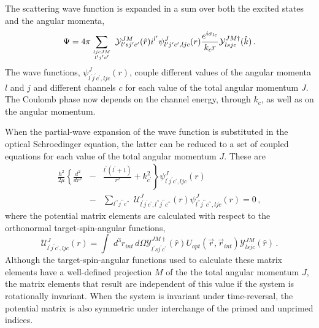 \documentclass[twocolumn,amsmath,amssymb,10pt,groupedaddress,a4paper]{revtex4}
\begin{document}
The scattering wave function is expanded in a sum over both the excited
states and the angular momenta, \begin{equation}
\Psi=4\pi\sum_{{{ljcJM\atop l^{\prime}j^{\prime}c^{\prime}}}}\;{\mathcal{Y}}_{l^{\prime}sj^{\prime}c^{\prime}}^{JM}(\hat{r})i^{l^{\prime}}\psi_{l^{\prime}j^{\prime}c^{\prime},ljc}^{J}(r)\frac{e^{i\sigma_{lc}}}{k_{c}r}{\mathcal{Y}}_{lsjc}^{JM\dagger}(\hat{k})\,.\label{cpar}\end{equation}
The wave functions, $\psi_{l^{\prime}j^{\prime}c^{\prime},ljc}^{J}(r)$,
couple different values of the angular momenta $l$ and $j$ and different
channels $c$ for each value of the total angular momentum $J$.  The
Coulomb phase now depends on the channel energy, through $k_{c}$,
as well as on the angular momentum.

When the partial-wave expansion of the wave function is substituted
in the optical Schroedinger equation, the latter can be reduced
to a set of coupled equations for each value of the total angular
momentum $J$. These are \begin{eqnarray}
\frac{\hbar^{2}}{2\mu}\left\{ \frac{d^{2}}{dr^{2}}\right. & - & \left.\frac{l^{\prime}(l^{\prime}+1)}{r^{2}}+k_{c^{\prime}}^{2}\right\} \psi_{l^{\prime}j^{\prime}c^{\prime},ljc}^{J}(r)\\
 & - & \sum_{l^{\prime\prime}j^{\prime\prime}c^{\prime\prime}}\;{\mathcal{U}}_{l^{\prime}j^{\prime}c^{\prime},l^{\prime\prime}j^{\prime\prime}c^{\prime\prime}}^{J}(r)\psi_{l^{\prime\prime}j^{\prime\prime}c^{\prime\prime},ljc}^{J}(r)=0\,,\nonumber \end{eqnarray}
 where the potential matrix elements are calculated with respect to
the orthonormal target-spin-angular functions, \begin{equation}
{\mathcal{U}}_{l^{\prime}j^{\prime}c^{\prime},ljc}^{J}(r)=\int\; d^{3}r_{int}\, d\Omega{\mathcal{Y}}_{l^{\prime}sj^{\prime}c^{\prime}}^{JM\dagger}(\hat{r})U_{opt}(\vec{r},\vec{r}_{int}){\mathcal{Y}}_{lsjc}^{JM}(\hat{r})\,.\label{uljc}\end{equation}
 Although the target-spin-angular functions used to calculate these
matrix elements have a well-defined projection $M$ of the the total
angular momentum $J$, the matrix elements that result are independent
of this value if the system is rotationally invariant. When the system
is invariant under time-reversal, the potential matrix is also symmetric
under interchange of the primed and unprimed indices.
\end{document}
